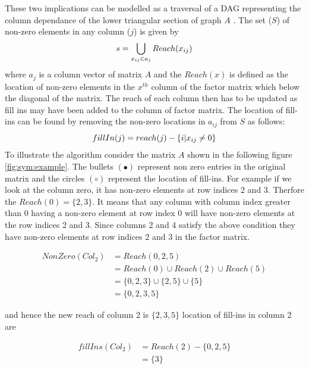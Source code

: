 These two implications can be modelled as a traversal of a DAG representing the 
column dependance of the lower triangular section of graph $A$ \cite{Nechma}.
The set ($S$) of non-zero elements in any column ($j$) is given by 
\begin{equation}
    \centering
    s = \bigcup \limits_{x_{ij} \in a_j} Reach(x_{ij})
    \label{eqn:symNZ}
\end{equation}
where $a_j$ is a column vector of matrix $A$ and the $Reach(x)$ is defined as the 
location of non-zero elements in the $x^{th}$ column of the factor matrix which below the diagonal of the matrix. 
The reach of each column then has to be updated as fill ins may have been added to the column of factor matrix.
The location of fill-ins can be found
by removing the non-zero locations in $a_{ij}$ from $S$ as follows:
\begin{equation}
    \centering
    fillIn(j) = reach(j) - \{i|x_{ij}\neq 0\}
    \label{en:fillIns}
\end{equation}
To illustrate the algorithm consider the matrix $A$ shown in the following figure
\ref{fig:sym:example}. The bullets $(\bullet)$ represent non zero entries in the original matrix
and the circles $(\circ)$ represent the location of fill-ins. For example if we look 
at the column zero, it has non-zero elements at row indices 2 and 3. Therfore the $Reach(0) = \{2, 3\}$. It means that
any column with column index greater than 0 having a non-zero element at row index 0
will have non-zero elements at the row indices 2 and 3. Since columns 2 and 4 
satisfy the above condition they have non-zero elements at row indices 2 and 3 in the
factor matrix.

\begin{equation*}
    \begin{split}
        NonZero(Col_2) &= Reach(0, 2, 5) \\
        &= Reach(0) \cup Reach(2) \cup Reach(5) \\
        &= \{0, 2, 3\} \cup \{2, 5\} \cup \{5\} \\
        &= \{0, 2, 3, 5\}
    \end{split}
\end{equation*}

and hence the new reach of column 2 is $\{2, 3, 5\}$ location of fill-ins in column 2 are

\begin{equation*}
    \begin{split}
        fillIns(Col_2) &= Reach(2) - \{0, 2, 5\} \\
        &= \{3\}
    \end{split}
\end{equation*} 

